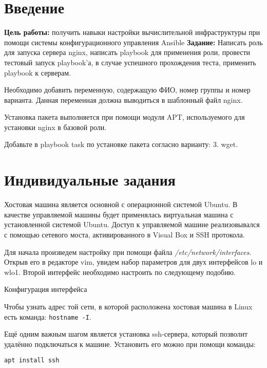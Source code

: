 \graphicspath{{./fourth/img/}}

\section*{\LARGE Введение}
\textbf{Цель работы:} получить навыки настройки вычислительной
инфраструктуры при помощи системы конфигурационного управления
Ansible
\textbf{Задание:}
Написать роль для запуска сервера nginx, написать playbook для
применения роли, провести тестовый запуск playbook’а, в случае успешного
прохождения теста, применить playbook к серверам.\par
Необходимо добавить переменную, содержащую ФИО, номер группы и
номер варианта. Данная переменная должна выводиться в шаблонный файл
nginx.\par
Установка пакета выполняется при помощи модуля APT, используемого
для установки nginx в базовой роли.\par
Добавьте в playbook task по установке пакета согласно варианту:
3. wget.

\clearpage

\section{Индивидуальные задания}
Хостовая машина является основной с операционной системой Ubuntu. В 
качестве управляемой машины будет применялась виртуальная машина с 
установленной системой Ubuntu. Доступ к управляемой машине 
реализовывался с помощью сетевого моста, активированного в Visual Box и 
SSH протокола.\par
Для начала произведем настройку при помощи файла
\textit{/etc/network/interfaces}. Открыв его в редакторе vim, увидем набор
параметров для двух интерфейсов lo и wlo1. Второй
интерфейс необходимо настроить по следующему подобию.

\begin{image}
	\caption{Конфигурация интерфейса}
\end{image}

Чтобы узнать адрес той сети, в которой расположена
хостовая машина в Linux есть команда: \texttt{hostname -I}.\par
Ещё одним важным шагом является установка ssh-сервера, который
позволит удалённо подключаться к машине. Установить его можно при
помощи команды:

\begin{verbatim}
apt install ssh
\end{verbatim}

